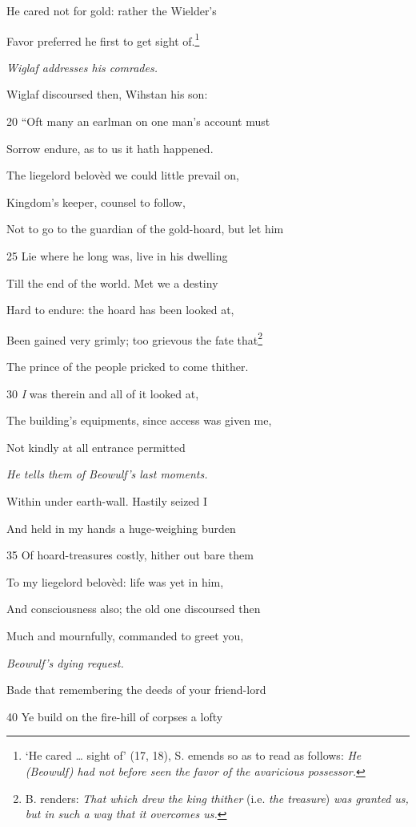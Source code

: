 He cared not for gold: rather the Wielder’s

Favor preferred he first to get sight of.\footnote{‘He cared … sight of’ (17, 18), S. emends so as to read as follows:
\emph{He (Beowulf) had not before seen the favor of the avaricious possessor.}}

\emph{Wiglaf addresses
his comrades.}

Wiglaf discoursed then, Wihstan his son:

20
“Oft many an earlman on one man’s account must

Sorrow endure, as to us it hath happened.

The liegelord belovèd we could little prevail on,

Kingdom’s keeper, counsel to follow,

Not to go to the guardian of the gold-hoard, but let him

25
Lie where he long was, live in his dwelling

Till the end of the world. Met we a destiny

Hard to endure: the hoard has been looked at,

Been gained very grimly; too grievous the fate that\footnote{B. renders: \emph{That which drew the king thither} (i.e. \emph{the treasure}) \emph{was
granted us, but in such a way that it overcomes us.}}

The prince of the people pricked to come thither.

30
\emph{I} was therein and all of it looked at,

The building’s equipments, since access was given me,

Not kindly at all entrance permitted

\emph{He tells them of
Beowulf’s last
moments.}

Within under earth-wall. Hastily seized I

And held in my hands a huge-weighing burden

35
Of hoard-treasures costly, hither out bare them

To my liegelord belovèd: life was yet in him,

And consciousness also; the old one discoursed then

Much and mournfully, commanded to greet you,

\emph{Beowulf’s dying
request.}

Bade that remembering the deeds of your friend-lord

40
Ye build on the fire-hill of corpses a lofty

